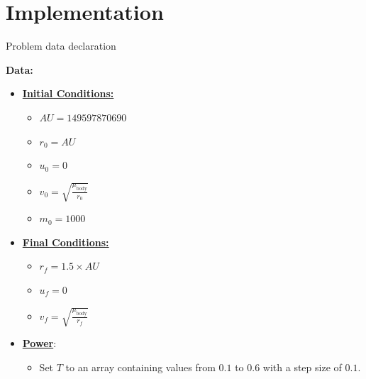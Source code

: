 \documentclass{article}
\begin{document}
	\section{Implementation}
	
	\begin{algorithm}[H]
		\caption{Problem data declaration}\label{alg:satellite_maneuvering}
		\begin{algorithmic}
			\State \textbf{Data:} \\
			\begin{itemize}[]
				\item \textbf{\underline{Initial Conditions:}}
				\begin{itemize}
					\item $AU = 149597870690$
					\item $r_0 = AU$
					\item $u_0 = 0$
					\item $v_0 = \sqrt{\frac{\mu_{\text{body}}}{r_0}}$
					\item$ m_0=1000$
				\end{itemize}
				\item \textbf{\underline{Final Conditions:}}
				\begin{itemize}
					\item $r_f = 1.5 \times AU$
					\item $u_f = 0$
					\item $v_f = \sqrt{\frac{\mu_{\text{body}}}{r_f}}$
				\end{itemize}
				\item \textbf{\underline{Power}}:
				\begin{itemize}
					\item Set $T$ to an array containing values from $0.1$ to $0.6$ with a step size of $0.1$.
				\end{itemize}

\end{itemize}
\end{algorithmic}
\end{algorithm}
\end{document}
